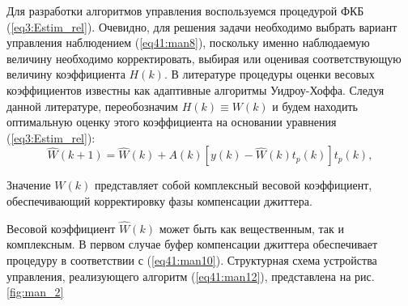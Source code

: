 Для разработки алгоритмов управления воспользуемся процедурой ФКБ (\ref{eq3:Estim_rel}). Очевидно, для решения задачи необходимо выбрать вариант управления наблюдением (\ref{eq41:man8}),
поскольку именно наблюдаемую величину необходимо корректировать, выбирая или оценивая соответствующую величину коэффициента $H(k)$. 
В литературе \cite{windrow,monzigo} процедуры оценки весовых коэффициентов известны как адаптивные алгоритмы Уидроу-Хоффа. 
Следуя данной литературе, переобозначим $H(k)\equiv W(k)$ и будем находить оптимальную оценку этого коэффициента на основании уравнения (\ref{eq3:Estim_rel}):
\begin{equation}\label{eq41:man12}
\hat W(k+1)=\hat W(k)+A(k)[y(k)-\hat W(k)t_{p}(k)]t_{p}(k),
\end{equation}

Значение $W(k)$ представляет собой комплексный весовой коэффициент, обеспечивающий корректировку фазы компенсации джиттера.

Весовой коэффициент $\hat W(k)$ может быть как вещественным, так и комплексным. 
В первом случае буфер компенсации джиттера обеспечивает процедуру в соответствии с (\ref{eq41:man10}). 
Структурная схема устройства управления, реализующего алгоритм (\ref{eq41:man12}), представлена на рис. \ref{fig:man_2}

